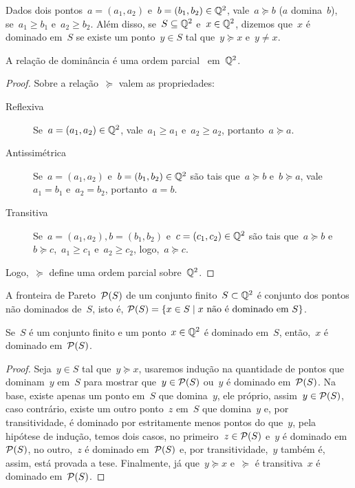 \begin{defi}
Dados dois pontos~$a = (a_1,a_2)$ e~$b = (b_1,b_2) \in \mathbb{Q}^2$, vale~$a \succeq b$ ($a$ domina~$b$), se~$a_1 \geq b_1$ e~$a_2 \geq b_2$. Além disso, se~$S \subseteq \mathbb{Q}^2$ e~$x \in \mathbb{Q}^2$, dizemos que~$x$ é dominado em~$S$ se existe um ponto~$y \in S$ tal que~$y \succeq x$ e~$y \neq x$.
\end{defi}

\begin{prop}
A relação de dominância é uma ordem parcial~\cite[Apêndice B]{CLRS} em~$\mathbb{Q}^2$.
\end{prop}

\begin{proof}
Sobre a relação~$\succeq$ valem as propriedades:
\begin{description}
\item[Reflexiva] Se~$a = (a_1,a_2) \in \mathbb{Q}^2$, vale~$a_1 \geq a_1$ e~$a_2 \geq a_2$, portanto~$a \succeq a$.
\item[Antissimétrica] Se~$a = (a_1,a_2)$ e~$b = (b_1,b_2) \in \mathbb{Q}^2$ são tais que~$a \succeq b$ e~$b \succeq a$, vale~$a_1 = b_1$ e~$a_2 = b_2$, portanto~$a = b$.
\item[Transitiva] Se~$a = (a_1,a_2), b = (b_1,b_2)$ e~$c = (c_1,c_2) \in \mathbb{Q}^2$ são tais que~$a \succeq b$ e~$b \succeq c$,~$a_1 \geq c_1$ e~$a_2 \geq c_2$, logo,~$a \succeq c$.
\end{description}
Logo,~$\succeq$ define uma ordem parcial sobre~$\mathbb{Q}^2$.
\end{proof}

\begin{defi}
A fronteira de Pareto~$\mathcal{P}(S)$ de um conjunto finito~$S \subset \mathbb{Q}^2$ é conjunto dos pontos não dominados de~$S$, isto é, ${\mathcal{P}(S) = \{x \in S \mid x \text{ não é dominado em } S\}}$.
\end{defi}

\begin{prop} \label{EDPD:DomP}
Se~$S$ é um conjunto finito e um ponto~$x \in \mathbb{Q}^2$ é dominado em~$S$, então,~$x$ é dominado em~$\mathcal{P}(S)$.
\end{prop}

\begin{proof}
Seja~$y \in S$ tal que~$y \succeq x$, usaremos indução na quantidade de pontos que dominam~$y$ em~$S$ para mostrar que~$y \in \mathcal{P}(S)$ ou~$y$ é dominado em~$\mathcal{P}(S)$. Na base, existe apenas um ponto em~$S$ que domina~$y$, ele próprio, assim~$y \in \mathcal{P}(S)$, caso contrário, existe um outro ponto~$z$ em~$S$ que domina~$y$ e, por transitividade, é dominado por estritamente menos pontos do que~$y$, pela hipótese de indução, temos dois casos, no primeiro~$z \in \mathcal{P}(S)$ e~$y$ é dominado em~$\mathcal{P}(S)$, no outro,~$z$ é dominado em~$\mathcal{P}(S)$ e, por transitividade,~$y$ também é, assim, está provada a tese. Finalmente, já que~$y \succeq x$ e~$\succeq$ é transitiva~$x$ é dominado em~$\mathcal{P}(S)$.
\end{proof}

